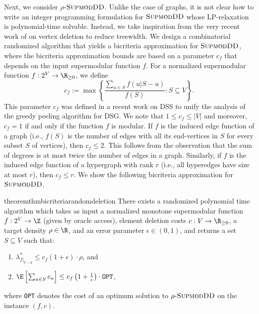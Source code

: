 \documentclass{article}
\newcommand{\dsg}{\textsc{DSG}\xspace}
\newcommand{\dss}{\textsc{DSS}\xspace}
\newcommand{\sdds}{\ensuremath{\textsc{SupmodDD}}\xspace}
\newcommand{\rhosdds}[1]{\ensuremath{#1\text{-}\sdds}}
\begin{document}
Next, we consider $\rho$-\sdds. Unlike the case of graphs, it is not clear how to write an integer programming formulation for \sdds whose LP-relaxation is polynomial-time solvable. Instead, 
we take inspiration from the very recent work of \cite{Włodarczyk_2024} on vertex deletion to reduce treewidth. We design a
combinatorial randomized algorithm that yields a bicriteria approximation for \sdds, where the bicriteria approximation bounds are based on a parameter $c_f$ that depends on the input supermodular function $f$. 
For a normalized supermodular function $f:2^V\rightarrow\R_{\ge 0}$, we define 
        \[c_f := \max\left\{\frac{\sum_{u \in S}f(u|S-u)}{f(S)}: S\subseteq V\right\}.
        \]
This parameter $c_f$ was defined in a recent work 
on \dss to unify the analysis of the greedy peeling algorithm for \dsg \cite{cqt-22}. 
We note that $1 \leq c_f \leq |V|$ and moreover, $c_f = 1$ if and only if the function $f$ is modular. If $f$ is the induced edge function of a graph (i.e., $f(S)$ is the number of edges with all its end-vertices in $S$ for every subset $S$ of vertices), then $c_f \le 2$. This follows from the observation that the sum of degrees is at most twice the number of edges in a graph. Similarly, if $f$ is the induced edge function of a hypergraph with rank $r$ (i.e., all hyperedges have size at most $r$), then $c_f \leq r$. 
We show the following bicriteria approximation for \sdds. 

\begin{restatable}{theorem}{thmbicriteriarandomdeletion}\label{thm:bicriteria-random-deletion}
    There exists a randomized polynomial time algorithm which takes as input a normalized  monotone supermodular function $f:2^V\rightarrow\Z$ (given by oracle access), element deletion costs $c:V\rightarrow\R_{\ge 0}$, a target density $\rho\in \R$, and an error parameter $\epsilon \in (0, 1)$, and returns a set $S\subseteq V$ such that:
    \begin{enumerate}
        \item $\lambda^*_{f|_{V - S}} \leq c_f(1+\epsilon)\cdot \rho$,  and 
        \item $\E\left[\sum_{u\in S}c_u\right] \leq c_f \left(1+\frac{1}{\epsilon}\right)\cdot \mathtt{OPT}$,
    \end{enumerate}
    where \texttt{OPT} denotes the cost of an optimum solution to \rhosdds{\rho} on the instance $(f,c)$.
\end{restatable}
\end{document}
